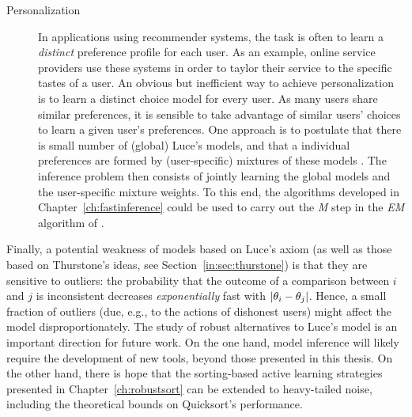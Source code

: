\begin{description}
\item[Personalization] In applications using recommender systems, the task is often to learn a \emph{distinct} preference profile for each user.
As an example, online service providers use these systems in order to taylor their service to the specific tastes of a user.
An obvious but inefficient way to achieve personalization is to learn a distinct choice model for every user.
As many users share similar preferences, it is sensible to take advantage of similar users' choices to learn a given user's preferences.
One approach is to postulate that there is small number of (global) Luce's models, and that a individual preferences are formed by (user-specific) mixtures of these models \citep{gormley2008exploring, ammar2015ranked}.
The inference problem then consists of jointly learning the global models and the user-specific mixture weights.
To this end, the algorithms developed in Chapter~\ref{ch:fastinference} could be used to carry out the \emph{M} step in the \emph{EM} algorithm of \citet{gormley2008exploring}.
\end{description}

Finally, a potential weakness of models based on Luce's axiom (as well as those based on Thurstone's ideas, see Section~\ref{in:sec:thurstone}) is that they are sensitive to outliers: the probability that the outcome of a comparison between $i$ and $j$ is inconsistent decreases \emph{exponentially} fast with $\lvert\theta_i - \theta_j\rvert$.
Hence, a small fraction of outliers (due, e.g., to the actions of dishonest users) might affect the model disproportionately.
The study of robust alternatives to Luce's model is an important direction for future work.
On the one hand, model inference will likely require the development of new tools, beyond those presented in this thesis.
On the other hand, there is hope that the sorting-based active learning strategies presented in Chapter~\ref{ch:robustsort} can be extended to heavy-tailed noise, including the theoretical bounds on Quicksort's performance.
